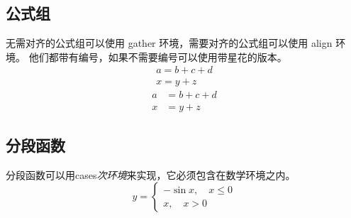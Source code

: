 \subsection{公式组}
无需对齐的公式组可以使用 gather 环境，需要对齐的公式组可以使用 align 环境。
他们都带有编号，如果不需要编号可以使用带星花的版本。
\begin{gather}
    a = b+c+d \\
    x = y+z
\end{gather}
\begin{align*}
    a &= b+c+d \\
    x &= y+z
\end{align*}
\subsection{分段函数}
分段函数可以用cases\textit{次环境}来实现，它必须包含在数学环境之内。
\begin{equation*}
    y=
    \begin{cases}
        -\sin{x},\quad x \leqslant 0 \\
        x,\quad x>0
    \end{cases} 
\end{equation*}